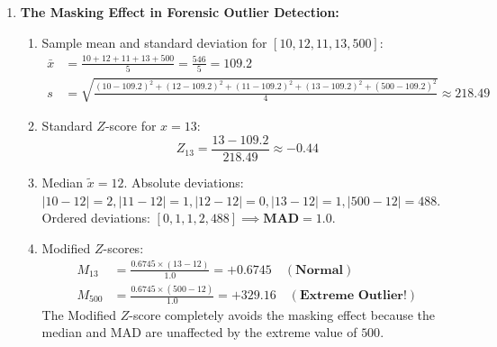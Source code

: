 \begin{enumerate}[label=\textbf{P6.\arabic*}]
    \item \textbf{The Masking Effect in Forensic Outlier Detection:}
    \begin{enumerate}[label=(\alph*)]
        \item Sample mean and standard deviation for $[10, 12, 11, 13, 500]$:
        \begin{align*}
        \bar{x} &= \frac{10 + 12 + 11 + 13 + 500}{5} = \frac{546}{5} = \mathbf{109.2} \\
        s &= \sqrt{\frac{(10-109.2)^2 + (12-109.2)^2 + (11-109.2)^2 + (13-109.2)^2 + (500-109.2)^2}{4}} \approx \mathbf{218.49}
        \end{align*}
        \item Standard $Z$-score for $x = 13$:
        \begin{equation*}
        Z_{13} = \frac{13 - 109.2}{218.49} \approx \mathbf{-0.44}
        \end{equation*}
        \item Median $\tilde{x} = 12$. Absolute deviations: $|10-12|=2, |11-12|=1, |12-12|=0, |13-12|=1, |500-12|=488$. Ordered deviations: $[0, 1, 1, 2, 488] \implies \mathbf{MAD = 1.0}$.
        \item Modified $Z$-scores:
        \begin{align*}
        M_{13} &= \frac{0.6745 \times (13 - 12)}{1.0} = \mathbf{+0.6745 \quad (\text{Normal})} \\
        M_{500} &= \frac{0.6745 \times (500 - 12)}{1.0} = \mathbf{+329.16 \quad (\text{Extreme Outlier!})}
        \end{align*}
        The Modified $Z$-score completely avoids the masking effect because the median and MAD are unaffected by the extreme value of $500$.
    \end{enumerate}


\end{enumerate}
